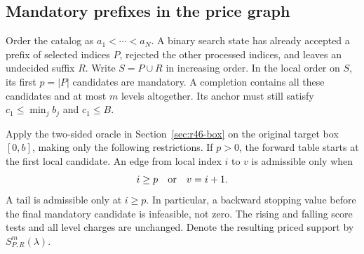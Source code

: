 \subsection{Mandatory prefixes in the price graph}
Order the catalog as $a_1<\cdots<a_N$. A binary search state has already accepted a prefix of selected indices $P$, rejected the other processed indices, and leaves an undecided suffix $R$. Write $S=P\cup R$ in increasing order. In the local order on $S$, its first $p=|P|$ candidates are mandatory. A completion contains all these candidates and at most $m$ levels altogether. Its anchor must still satisfy $c_1\leq\min_jb_j$ and $c_1\leq B$.

Apply the two-sided oracle in Section~\ref{sec:r46-box} on the original target box $[0,b]$, making only the following restrictions. If $p>0$, the forward table starts at the first local candidate. An edge from local index $i$ to $v$ is admissible only when
\begin{equation}\label{eq:r51-required-edge}
 i\geq p\quad\hbox{or}\quad v=i+1.
\end{equation}
A tail is admissible only at $i\geq p$. In particular, a backward stopping value before the final mandatory candidate is infeasible, not zero. The rising and falling score tests and all level charges are unchanged. Denote the resulting priced support by $S_{P,R}^{m}(\lambda)$.

